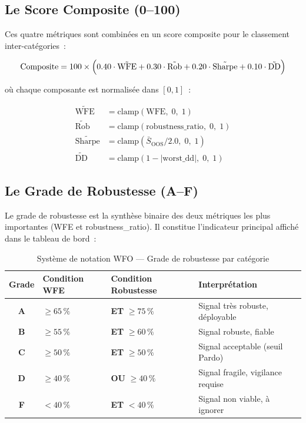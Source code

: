 \subsection{Le Score Composite (0–100)}

Ces quatre métriques sont combinées en un score composite pour le classement
inter-catégories~:

\begin{equation}
\text{Composite} = 100 \times \Bigl(
0.40 \cdot \tilde{\text{WFE}} +
0.30 \cdot \tilde{\text{Rob}} +
0.20 \cdot \tilde{\text{Sharpe}} +
0.10 \cdot \tilde{\text{DD}}
\Bigr)
\label{eq:composite}
\end{equation}

où chaque composante est normalisée dans $[0, 1]$~:

\begin{align}
\tilde{\text{WFE}}    &= \text{clamp}(\text{WFE},\; 0,\; 1) \label{eq:norm_wfe} \\
\tilde{\text{Rob}}    &= \text{clamp}(\text{robustness\_ratio},\; 0,\; 1) \label{eq:norm_rob} \\
\tilde{\text{Sharpe}} &= \text{clamp}(\bar{S}_{\text{OOS}} / 2.0,\; 0,\; 1) \label{eq:norm_sharpe} \\
\tilde{\text{DD}}     &= \text{clamp}(1 - |\text{worst\_dd}|,\; 0,\; 1) \label{eq:norm_dd}
\end{align}

\subsection{Le Grade de Robustesse (A–F)}
\label{sec:wfo_grade}

Le grade de robustesse est la synthèse binaire des deux métriques les plus importantes
(WFE et robustness\_ratio). Il constitue l'indicateur principal affiché dans le
tableau de bord~:

\begin{table}[H]
\centering
\caption{Système de notation WFO — Grade de robustesse par catégorie}
\label{tab:wfo_grades}
\begin{tabularx}{\linewidth}{@{}cYYY@{}}
\toprule
\textbf{Grade} & \textbf{Condition WFE} & \textbf{Condition Robustesse} & \textbf{Interprétation} \\
\midrule
\textbf{A} & $\geq 65\,\%$ & \textbf{ET} $\geq 75\,\%$ & Signal très robuste, déployable \\
\textbf{B} & $\geq 55\,\%$ & \textbf{ET} $\geq 60\,\%$ & Signal robuste, fiable \\
\textbf{C} & $\geq 50\,\%$ & \textbf{ET} $\geq 50\,\%$ & Signal acceptable (seuil Pardo) \\
\textbf{D} & $\geq 40\,\%$ & \textbf{OU} $\geq 40\,\%$ & Signal fragile, vigilance requise \\
\textbf{F} & $< 40\,\%$ & \textbf{ET} $< 40\,\%$ & Signal non viable, à ignorer \\
\bottomrule
\end{tabularx}
\end{table}

